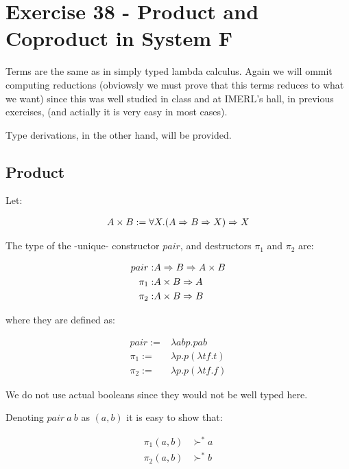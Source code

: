\section{Exercise 38 - Product and Coproduct in System F}


Terms are the same as in simply typed lambda calculus.
Again we will ommit computing reductions (obviowsly we must prove that
this terms reduces to what we want) since this was
well studied in class and at IMERL's hall, in previous exercises,
(and actially it is very easy in most cases).

Type derivations, in the other hand, will be provided.


\subsection*{Product}

Let:

\begin{align*}
  A \times B := \forall X. (A\Rightarrow B\Rightarrow X) \Rightarrow X \nonumber
\end{align*}
  
  The type of the -unique- constructor $pair$, and destructors $\pi_1$ and
  $\pi_2$ are:

\begin{align}
  pair  :& A \Rightarrow B \Rightarrow A\times B  \nonumber \\
  \pi_1 :& A \times B \Rightarrow A        \nonumber \\
  \pi_2 :& A \times B \Rightarrow B        \nonumber
\end{align}
  
  where they are defined as:

\begin{align}
  pair :=& \lambda a b p . p a b        \nonumber \\
  \pi_1:=& \lambda p. p (\lambda t f.t) \nonumber \\
  \pi_2:=& \lambda p. p (\lambda t f.f) \nonumber
\end{align}

We do not use actual booleans since they would not be well typed here.

Denoting $pair\ a\ b$ as $(a,b)$ it is easy to show that:

\begin{align*}
  \pi_1 (a,b) &\succ^{*} a \\
  \pi_2 (a,b) &\succ^{*} b
\end{align*}

